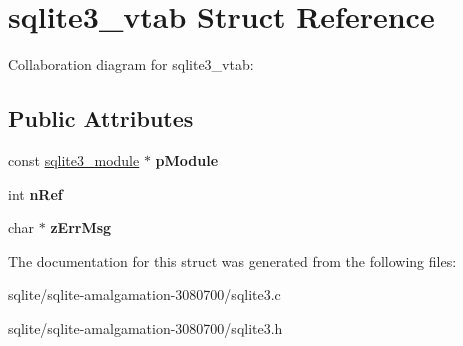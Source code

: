 \hypertarget{structsqlite3__vtab}{\section{sqlite3\+\_\+vtab Struct Reference}
\label{structsqlite3__vtab}
}


Collaboration diagram for sqlite3\+\_\+vtab\+:
\subsection*{Public Attributes}
\begin{DoxyCompactItemize}
\item 
\hypertarget{structsqlite3__vtab_acf0d906e36b113669eaa883c5f8b5ba0}{const \hyperlink{structsqlite3__module}{sqlite3\+\_\+module} $\ast$ {\bfseries p\+Module}}\label{structsqlite3__vtab_acf0d906e36b113669eaa883c5f8b5ba0}

\item 
\hypertarget{structsqlite3__vtab_ab3c80d385849bdd82363a0df7d6fcba8}{int {\bfseries n\+Ref}}\label{structsqlite3__vtab_ab3c80d385849bdd82363a0df7d6fcba8}

\item 
\hypertarget{structsqlite3__vtab_a47331586775d674ae951b07ebb902fca}{char $\ast$ {\bfseries z\+Err\+Msg}}\label{structsqlite3__vtab_a47331586775d674ae951b07ebb902fca}

\end{DoxyCompactItemize}


The documentation for this struct was generated from the following files\+:\begin{DoxyCompactItemize}
\item 
sqlite/sqlite-\/amalgamation-\/3080700/sqlite3.\+c\item 
sqlite/sqlite-\/amalgamation-\/3080700/sqlite3.\+h\end{DoxyCompactItemize}
